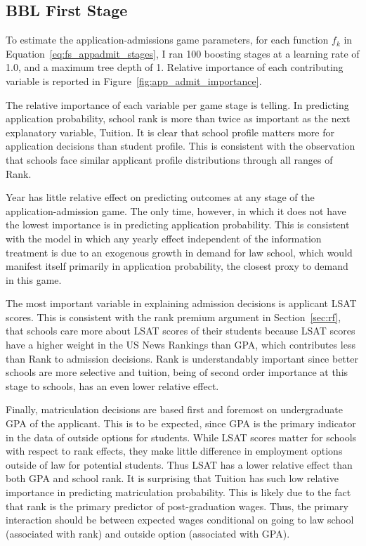 \documentclass[12pt]{article}
\theoremstyle{definition}
\begin{document}
\subsection{BBL First Stage}
\label{sec:structural_fs}


To estimate the application-admissions game parameters, for each function $f_k$ in Equation~\eqref{eq:fs_appadmit_stages}, I ran 100 boosting stages at a learning rate of 1.0, and a maximum tree depth of 1. Relative importance of each contributing variable is reported in Figure~\ref{fig:app_admit_importance}.

The relative importance of each variable per game stage is telling. In predicting application probability, school rank is more than twice as important as the next explanatory variable, Tuition. It is clear that school profile matters more for application decisions than student profile. This is consistent with the observation that schools face similar applicant profile distributions through all ranges of Rank.

Year has little relative effect on predicting outcomes at any stage of the application-admission game. The only time, however, in which it does not have the lowest importance is in predicting application probability. This is consistent with the model in which any yearly effect independent of the information treatment is due to an exogenous growth in demand for law school, which would manifest itself primarily in application probability, the closest proxy to demand in this game.

The most important variable in explaining admission decisions is applicant LSAT scores. This is consistent with the rank premium argument in Section~\ref{sec:rf}, that schools care more about LSAT scores of their students because LSAT scores have a higher weight in the US News Rankings than GPA, which contributes less than Rank to admission decisions. Rank is understandably important since better schools are more selective and tuition, being of second order importance at this stage to schools, has an even lower relative effect.

Finally, matriculation decisions are based first and foremost on undergraduate GPA of the applicant. This is to be expected, since GPA is the primary indicator in the data of outside options for students. While LSAT scores matter for schools with respect to rank effects, they make little difference in employment options outside of law for potential students. Thus LSAT has a lower relative effect than both GPA and school rank. It is surprising that Tuition has such low relative importance in predicting matriculation probability. This is likely due to the fact that rank is the primary predictor of post-graduation wages. Thus, the primary interaction should be between expected wages conditional on going to law school (associated with rank) and outside option (associated with GPA).
\end{document}
